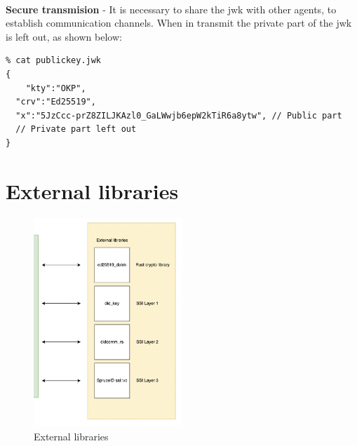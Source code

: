 \paragraph{}
\textbf{Secure transmision} - It is necessary to share the jwk with other agents, to establish
communication channels. When in transmit the private part of the jwk is
left out, as shown below:

\begin{lstlisting}
% cat publickey.jwk 
{
    "kty":"OKP",
  "crv":"Ed25519",
  "x":"5JzCcc-prZ8ZILJKAzl0_GaLWwjb6epW2kTiR6a8ytw", // Public part
  // Private part left out
} 
\end{lstlisting}





\pagebreak





\hypertarget{external-libraries}{%
\section{External libraries}\label{external-libraries}}

\begin{figure}
\centering
\includegraphics[width=0.5\textwidth]{Architecture 1442df162dbe45f4a423ba37d3e12363/Untitled 6.png}
\caption{External libraries}
\end{figure}

